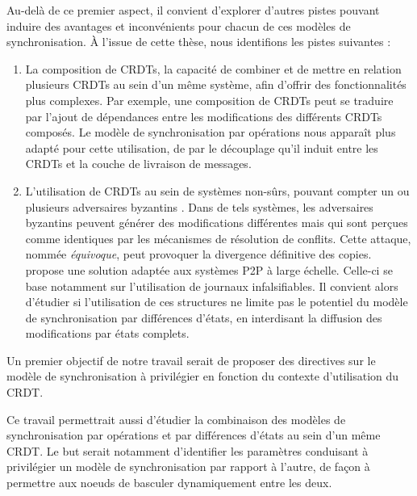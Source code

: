 Au-delà de ce premier aspect, il convient d'explorer d'autres pistes pouvant induire des avantages et inconvénients pour chacun de ces modèles de synchronisation.
À l'issue de cette thèse, nous identifions les pistes suivantes :
\begin{enumerate}
    \item La composition de \acp{CRDT}, \ie la capacité de combiner et de mettre en relation plusieurs \acp{CRDT} au sein d'un même système, afin d'offrir des fonctionnalités plus complexes.
        Par exemple, une composition de \acp{CRDT} peut se traduire par l'ajout de dépendances entre les modifications des différents \acp{CRDT} composés.
        Le modèle de synchronisation par opérations nous apparaît plus adapté pour cette utilisation, de par le découplage qu'il induit entre les \acp{CRDT} et la couche de livraison de messages.

    \item L'utilisation de \acp{CRDT} au sein de systèmes non-sûrs, \ie pouvant compter un ou plusieurs adversaires byzantins \cite{2019-byzantine-generals-problem-lamport}.
        Dans de tels systèmes, les adversaires byzantins peuvent générer des modifications différentes mais qui sont perçues comme identiques par les mécanismes de résolution de conflits.
        Cette attaque, nommée \emph{équivoque}, peut provoquer la divergence définitive des copies.
        \cite{2018-prunable-authenticated-log-vic} propose une solution adaptée aux systèmes \ac{P2P} à large échelle.
        Celle-ci se base notamment sur l'utilisation de journaux infalsifiables.
        Il convient alors d'étudier si l'utilisation de ces structures ne limite pas le potentiel du modèle de synchronisation par différences d'états, \eg en interdisant la diffusion des modifications par états complets.
\end{enumerate}

Un premier objectif de notre travail serait de proposer des directives sur le modèle de synchronisation à privilégier en fonction du contexte d'utilisation du \ac{CRDT}.

Ce travail permettrait aussi d'étudier la combinaison des modèles de synchronisation par opérations et par différences d'états au sein d'un même \ac{CRDT}.
Le but serait notamment d'identifier les paramètres conduisant à privilégier un modèle de synchronisation par rapport à l'autre, de façon à permettre aux noeuds de basculer dynamiquement entre les deux.
